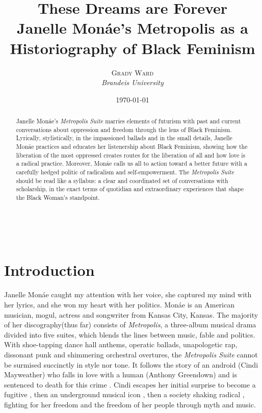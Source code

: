 \documentclass[a4paper, 11pt]{article} %
\title{\textbf{\linespread{2.1}These Dreams are Forever}\\ %
Janelle Mon\'ae's Metropolis as a Historiography of Black Feminism} %
\author{\textsc{Grady Ward} %
\\{\textit{Brandeis University}}} %
\date{\today} %
\makeatletter
\renewcommand{\maketitle}{ %
\begin{flushright} %
	{\LARGE\@title} %

	\vspace{40pt} %

	{\large\@author} %
	\\\@date %

	\vspace{30pt} %
\end{flushright}
}
\makeatother
\begin{document}
\maketitle %


\begin{abstract}

Janelle Mon\'ae's \emph{Metropolis Suite} marries elements of futurism with past and current conversations about oppression and freedom through the lens of Black Feminism.
Lyrically, stylistically, in the impassioned ballads and in the small details, Janelle Mon\'ae practices and educates her listenership about Black Feminism, showing how the liberation of the most oppressed creates routes for the liberation of all and how love is a radical practice.
Moreover, Mon\'ae calls us all to action toward a better future with a carefully hedged politic of radicalism and self-empowerment.
The \emph{Metropolis Suite} should be read like a syllabus: a clear and coordinated set of conversations with scholarship, in the exact terms of quotidian and extraordinary experiences that shape the Black Woman's standpoint.
\end{abstract}

\vspace{30pt}


\section*{Introduction}

Janelle Mon\'ae caught my attention with her voice, she captured my mind with her lyrics, and she won my heart with her politics.
Mon\'ae is an American musician, mogul, actress and songwriter from Kansas City, Kansas.
The majority of her discography(thus far) consists of \emph{Metropolis}, a three-album musical drama divided into five suites, which blends the lines between music, fable and politics.
With shoe-tapping dance hall anthems, operatic ballads, unapologetic rap, dissonant punk and shimmering orchestral overtures, the \emph{Metropolis Suite} cannot be surmised succinctly in style nor tone.
It follows the story of an android (Cindi Mayweather) who falls in love with a human (Anthony Greendown) and is sentenced to death for this crime \cite{wolfmasters}.
Cindi escapes her initial surprise to become a fugitive \cite{manymoons}, then an underground musical icon \cite{favoritefugitive}, then a society shaking radical \cite{fiveseveneighttwoone}, fighting for her freedom and the freedom of her people through myth and music.
\end{document}
